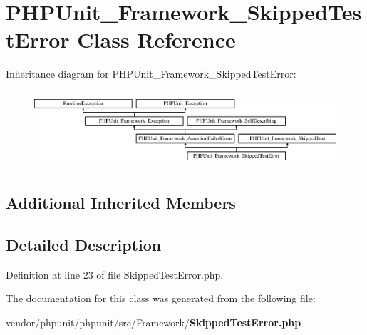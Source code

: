 \section{P\+H\+P\+Unit\+\_\+\+Framework\+\_\+\+Skipped\+Test\+Error Class Reference}
\label{class_p_h_p_unit___framework___skipped_test_error}
Inheritance diagram for P\+H\+P\+Unit\+\_\+\+Framework\+\_\+\+Skipped\+Test\+Error\+:\begin{figure}[H]
\begin{center}
\leavevmode
\includegraphics[height=2.860792cm]{class_p_h_p_unit___framework___skipped_test_error}
\end{center}
\end{figure}
\subsection*{Additional Inherited Members}


\subsection{Detailed Description}


Definition at line 23 of file Skipped\+Test\+Error.\+php.



The documentation for this class was generated from the following file\+:\begin{DoxyCompactItemize}
\item 
vendor/phpunit/phpunit/src/\+Framework/{\bf Skipped\+Test\+Error.\+php}\end{DoxyCompactItemize}
